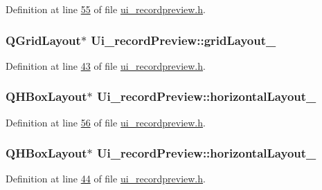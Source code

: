 Definition at line \hyperlink{a00053_source_l00055}{55} of file \hyperlink{a00053_source}{ui\+\_\+recordpreview.\+h}.

\hypertarget{a00028_a21cc18536b3c91200eceb2e5e01d3293}{
\subsubsection[{grid\+Layout\+\_\+4}]{\setlength{\rightskip}{0pt plus 5cm}Q\+Grid\+Layout$\ast$ Ui\+\_\+record\+Preview\+::grid\+Layout\+\_}}\label{a00028_a21cc18536b3c91200eceb2e5e01d3293}


Definition at line \hyperlink{a00053_source_l00043}{43} of file \hyperlink{a00053_source}{ui\+\_\+recordpreview.\+h}.

\hypertarget{a00028_a14cf293099dc18a097ecd71460db1701}{
\subsubsection[{horizontal\+Layout\+\_\+3}]{\setlength{\rightskip}{0pt plus 5cm}Q\+H\+Box\+Layout$\ast$ Ui\+\_\+record\+Preview\+::horizontal\+Layout\+\_}}\label{a00028_a14cf293099dc18a097ecd71460db1701}


Definition at line \hyperlink{a00053_source_l00056}{56} of file \hyperlink{a00053_source}{ui\+\_\+recordpreview.\+h}.

\hypertarget{a00028_a0a28f44d5179dd3cd2c84f4a1ac581c8}{
\subsubsection[{horizontal\+Layout\+\_\+4}]{\setlength{\rightskip}{0pt plus 5cm}Q\+H\+Box\+Layout$\ast$ Ui\+\_\+record\+Preview\+::horizontal\+Layout\+\_}}\label{a00028_a0a28f44d5179dd3cd2c84f4a1ac581c8}


Definition at line \hyperlink{a00053_source_l00044}{44} of file \hyperlink{a00053_source}{ui\+\_\+recordpreview.\+h}.

